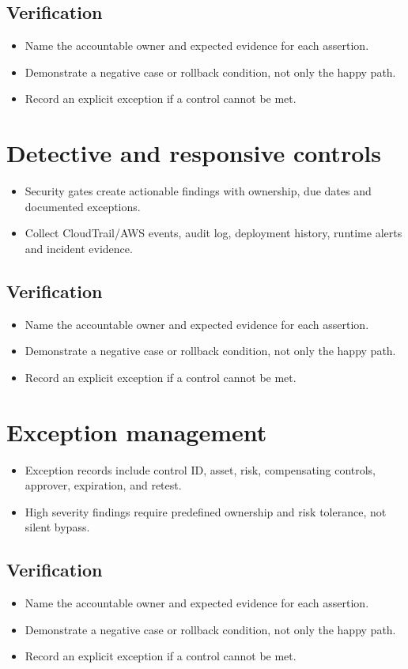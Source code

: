 \documentclass[10pt,letterpaper]{article}
\begin{document}
\subsection{Verification}
\begin{itemize}
\item Name the accountable owner and expected evidence for each assertion.
\item Demonstrate a negative case or rollback condition, not only the happy path.
\item Record an explicit exception if a control cannot be met.
\end{itemize}


\section{Detective and responsive controls}
\begin{itemize}
\item Security gates create actionable findings with ownership, due dates and documented exceptions.
\item Collect CloudTrail/AWS events, audit log, deployment history, runtime alerts and incident evidence.
\end{itemize}
\subsection{Verification}
\begin{itemize}
\item Name the accountable owner and expected evidence for each assertion.
\item Demonstrate a negative case or rollback condition, not only the happy path.
\item Record an explicit exception if a control cannot be met.
\end{itemize}


\section{Exception management}
\begin{itemize}
\item Exception records include control ID, asset, risk, compensating controls, approver, expiration, and retest.
\item High severity findings require predefined ownership and risk tolerance, not silent bypass.
\end{itemize}
\subsection{Verification}
\begin{itemize}
\item Name the accountable owner and expected evidence for each assertion.
\item Demonstrate a negative case or rollback condition, not only the happy path.
\item Record an explicit exception if a control cannot be met.
\end{itemize}
\end{document}
